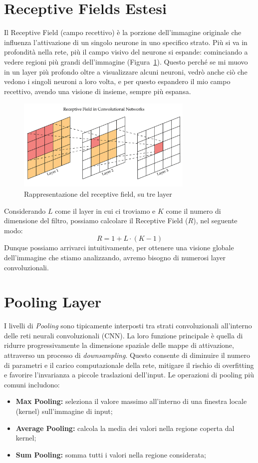\section{Receptive Fields Estesi}

Il Receptive Field (campo recettivo) è la porzione dell’immagine originale che influenza l’attivazione di un singolo neurone in uno specifico strato. Più si va in profondità nella rete, più il campo visivo del neurone si espande: cominciando a vedere regioni più grandi dell'immagine (Figura~\ref{fig:recp_field}). Questo perché se mi muovo in un layer più profondo oltre a visualizzare alcuni neuroni, vedrò anche ciò che vedono i singoli neuroni a loro volta, e per questo espandero il mio campo recettivo, avendo una visione di insieme, sempre più espansa.
\begin{figure}
    \centering
    \includegraphics[width=0.75\textwidth]{figure/receptive_field.png}
    \caption{Rappresentazione del receptive field, su tre layer}
    \label{fig:recp_field}
\end{figure}
Considerando $L$ come il layer in cui ci troviamo e $K$ come il numero di dimensione del filtro, possiamo calcolare il Receptive Field ($R$), nel seguente modo:
\[
R = 1 + L \cdot (K - 1)
\]
Dunque possiamo arrivarci intuitivamente, per ottenere una visione globale dell'immagine che stiamo analizzando, avremo bisogno di numerosi layer convoluzionali.
\section{Pooling Layer}

I livelli di \textit{Pooling} sono tipicamente interposti tra strati convoluzionali all'interno delle reti neurali convoluzionali (CNN). La loro funzione principale è quella di ridurre progressivamente la dimensione spaziale delle mappe di attivazione, attraverso un processo di \textit{downsampling}. Questo consente di diminuire il numero di parametri e il carico computazionale della rete, mitigare il rischio di overfitting e favorire l’invarianza a piccole traslazioni dell’input. Le operazioni di pooling più comuni includono:
\begin{itemize}
    \item \textbf{Max Pooling:} seleziona il valore massimo all'interno di una finestra locale (kernel) sull'immagine di input;
    \item \textbf{Average Pooling:} calcola la media dei valori nella regione coperta dal kernel;
    \item \textbf{Sum Pooling:} somma tutti i valori nella regione considerata;
\end{itemize}


